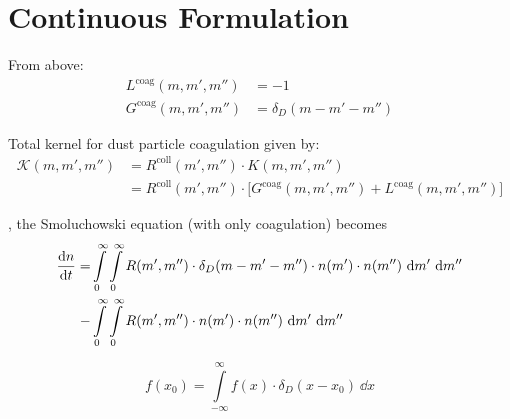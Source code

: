 \section{Continuous Formulation}

    

    From above:
    \begin{align}
        L^\text{coag}(m,m',m'') &= -1 \\
        G^\text{coag}(m,m',m'') &= \delta_D(m-m'-m'')
    \end{align}

    Total kernel for dust particle coagulation given by:
    \begin{align}
        \mathcal K(m,m',m'')
        &= R^\text{coll}(m',m'') \cdot K(m,m',m'') \\
        &= R^\text{coll}(m',m'') \cdot \bigg[G^\text{coag}(m,m',m'') + L^\text{coag}(m,m',m'')\bigg]
    \end{align}

    , the
    Smoluchowski equation (with only coagulation) becomes
    \begin{align}
        \frac{\text{d} n}{\text{d} t}
        = 
            &\int\limits_0^\infty \int\limits_0^\infty R(m',m'') \cdot \delta_D(m-m'-m'')
            \cdot n(m') \cdot n(m'') \ \text dm' \ \text dm'' \\
            -&\int\limits_0^\infty \int\limits_0^\infty R(m',m'')
            \cdot n(m') \cdot n(m'') \ \text dm' \ \text dm'' 
    \end{align}

    \begin{equation}
        f(x_0) = \int\limits_{-\infty}^{\infty} f(x) \cdot \delta_D(x-x_0) \ \dd x 
    \end{equation}

